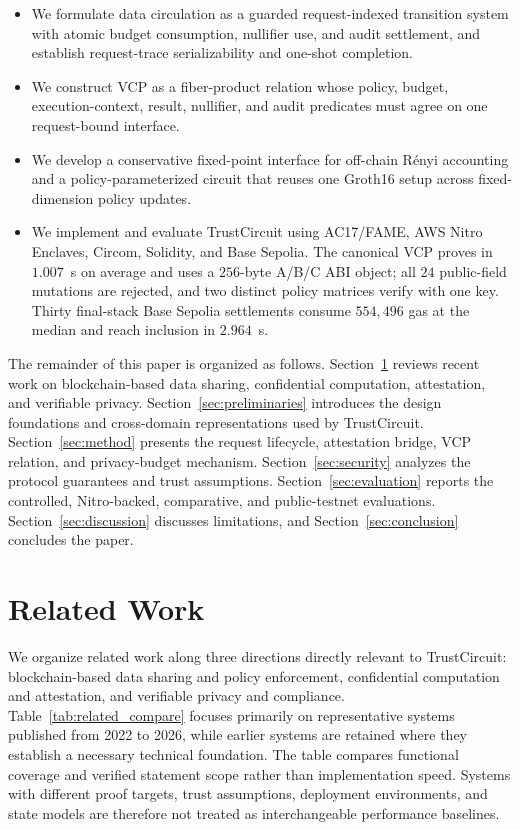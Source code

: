 \documentclass[10pt,journal,compsoc]{IEEEtran}
\begin{document}
\begin{itemize}
    \item We formulate data circulation as a guarded request-indexed transition system with atomic budget consumption, nullifier use, and audit settlement, and establish request-trace serializability and one-shot completion.

    \item We construct VCP as a fiber-product relation whose policy, budget, execution-context, result, nullifier, and audit predicates must agree on one request-bound interface.

    \item We develop a conservative fixed-point interface for off-chain R\'enyi accounting and a policy-parameterized circuit that reuses one Groth16 setup across fixed-dimension policy updates.

    \item We implement and evaluate TrustCircuit using AC17/FAME, AWS Nitro Enclaves, Circom, Solidity, and Base Sepolia. The canonical VCP proves in $1.007$~s on average and uses a $256$-byte A/B/C ABI object; all $24$ public-field mutations are rejected, and two distinct policy matrices verify with one key. Thirty final-stack Base Sepolia settlements consume $554{,}496$ gas at the median and reach inclusion in $2.964$~s.
\end{itemize}

The remainder of this paper is organized as follows. Section~\ref{sec:related} reviews recent work on blockchain-based data sharing, confidential computation, attestation, and verifiable privacy. Section~\ref{sec:preliminaries} introduces the design foundations and cross-domain representations used by TrustCircuit. Section~\ref{sec:method} presents the request lifecycle, attestation bridge, VCP relation, and privacy-budget mechanism. Section~\ref{sec:security} analyzes the protocol guarantees and trust assumptions. Section~\ref{sec:evaluation} reports the controlled, Nitro-backed, comparative, and public-testnet evaluations. Section~\ref{sec:discussion} discusses limitations, and Section~\ref{sec:conclusion} concludes the paper.

\section{Related Work}\label{sec:related}

We organize related work along three directions directly relevant to TrustCircuit: blockchain-based data sharing and policy enforcement, confidential computation and attestation, and verifiable privacy and compliance. Table~\ref{tab:related_compare} focuses primarily on representative systems published from 2022 to 2026, while earlier systems are retained where they establish a necessary technical foundation. The table compares functional coverage and verified statement scope rather than implementation speed. Systems with different proof targets, trust assumptions, deployment environments, and state models are therefore not treated as interchangeable performance baselines.
\end{document}
